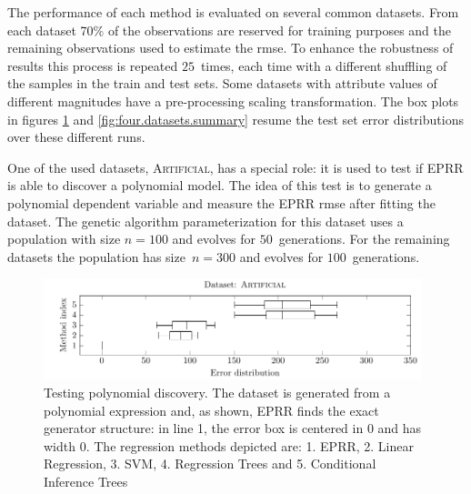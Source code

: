 \documentclass[review,preprint]{elsarticle}
\begin{document}
The performance of each method is evaluated on several common datasets. From each dataset 70\% of the observations are reserved for training purposes and the remaining observations used to estimate the \ac{rmse}. To enhance the robustness of results this process is repeated $25$~times, each time with a different shuffling of the samples in the train and test sets. Some datasets with attribute values of different magnitudes have a pre-processing scaling transformation. The box plots in figures \ref{artificial_dataset1_lambda1.0} and \ref{fig:four.datasets.summary} resume the test set error distributions over these different runs.

One of the used datasets, \textsc{Artificial}, has a special role: it is used to test if \ac{EPRR} is able to discover a polynomial model. The idea of this test is to generate a polynomial dependent variable and measure the \ac{EPRR} \ac{rmse} after fitting the dataset. The genetic algorithm parameterization for this dataset uses a population with size $n=100$ and evolves for $50$~generations. For the remaining datasets the population has size~$n=300$ and evolves for $100$~generations.

\begin{figure}[tb]\begin{center}
\includegraphics[width=0.98\textwidth]{figure_2.pdf}
\caption{Testing polynomial discovery. The dataset is generated from a polynomial expression and, as shown, \ac{EPRR} finds the exact generator structure: in line 1, the error box is centered in $0$ and has width $0$.  The regression methods depicted are: 1. \ac{EPRR}, 2. Linear Regression, 3. SVM, 4. Regression Trees and 5. Conditional Inference Trees}
\label{artificial_dataset1_lambda1.0}
\end{center}
\end{figure}
\end{document}
